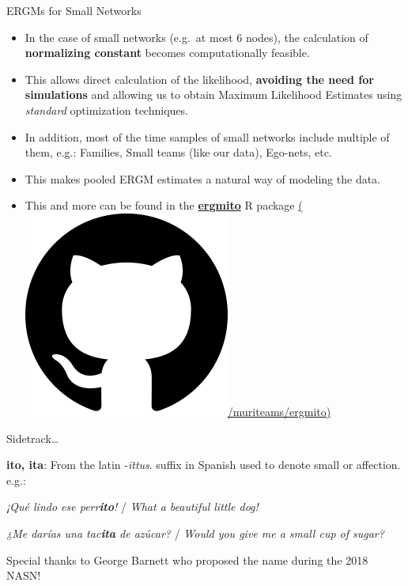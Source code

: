 \documentclass[10pt,ignorenonframetext,aspectratio=169,]{beamer}
\begin{document}
\begin{frame}{ERGMs for Small Networks}
\protect\hypertarget{ergms-for-small-networks}{}

\begin{itemize}
\item
  In the case of small networks (e.g.~at most 6 nodes), the calculation
  of \color[HTML]{5726e7} \textbf{normalizing constant}\color{black}{}
  becomes computationally feasible.\pause
\item
  This allows direct calculation of the likelihood,
  \textbf{avoiding the need for simulations} and allowing us to obtain
  Maximum Likelihood Estimates using \textit{standard} optimization
  techniques.\pause
\item
  In addition, most of the time samples of small networks include
  multiple of them, e.g.: Families, Small teams (like our data),
  Ego-nets, etc.\pause
\item
  This makes pooled ERGM estimates a natural way of modeling the
  data.\pause
\item
  This and more can be found in the
  \href{https://github.com/muriteams/ergmito}{\textbf{ergmito}} R
  package
  \href{https://github.com/muriteams/ergmito}{(\includegraphics[width=.025\linewidth]{fig/github.png}/muriteams/ergmito)}
\end{itemize}

\end{frame}

\begin{frame}

Sidetrack\ldots{}

\begin{minipage}[c]{1\linewidth}
\large \textbf{ito, ita}: From the latin -\textit{\=ittus}. suffix in Spanish used to denote small or affection. e.g.:

\hspace{.5cm} \textit{¡Qué lindo ese perr\textcolor{USCCardinal}{\textbf{ito}}!} / \textit{What a beautiful little dog!}

\hspace{.5cm} \textit{¿Me darías una tac\textcolor{USCCardinal}{\textbf{ita}} de azúcar?} / \textit{Would you give me a small cup of sugar?}
\normalsize
\end{minipage}\pause

\alert{Special thanks to George Barnett who proposed the name during the 2018 NASN!}

\end{frame}
\end{document}
